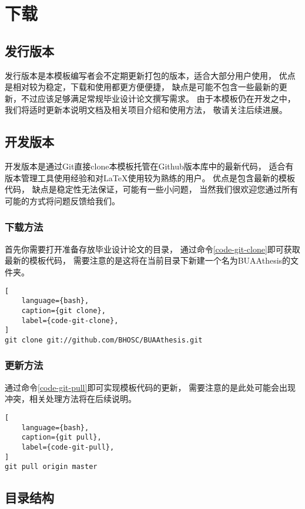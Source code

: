 ﻿%
\chapter{下载}

\section{发行版本}

发行版本是本模板编写者会不定期更新打包的版本，适合大部分用户使用，
优点是相对较为稳定，下载和使用都更方便便捷，
缺点是可能不包含一些最新的更新，不过应该足够满足常规毕业设计论文撰写需求。
由于本模板仍在开发之中，我们将适时更新本说明文档及相关项目介绍和使用方法，
敬请关注后续进展。

\section{开发版本}

开发版本是通过Git直接clone本模板托管在Github版本库中的最新代码，
适合有版本管理工具使用经验和对LaTeX使用较为熟练的用户。
优点是包含最新的模板代码，
缺点是稳定性无法保证，可能有一些小问题，
当然我们很欢迎您通过所有可能的方式将问题反馈给我们。

\subsection{下载方法}
首先你需要打开准备存放毕业设计论文的目录，
通过命令\ref{code-git-clone}即可获取最新的模板代码，
需要注意的是这将在当前目录下新建一个名为BUAAthesis的文件夹。
\begin{lstlisting}[
    language={bash},
    caption={git clone},
    label={code-git-clone},
]
git clone git://github.com/BHOSC/BUAAthesis.git
\end{lstlisting}

\subsection{更新方法}
通过命令\ref{code-git-pull}即可实现模板代码的更新，
需要注意的是此处可能会出现冲突，相关处理方法将在后续说明。
\begin{lstlisting}[
    language={bash},
    caption={git pull},
    label={code-git-pull},
]
git pull origin master
\end{lstlisting}

\section{目录结构}

